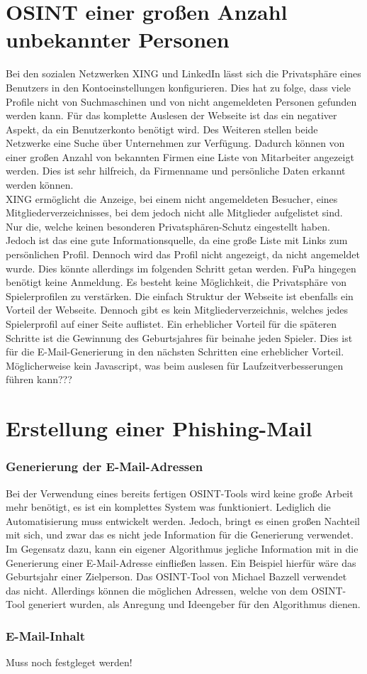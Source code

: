 \section{OSINT einer großen Anzahl unbekannter Personen}
Bei den sozialen Netzwerken XING und LinkedIn lässt sich die Privatsphäre eines Benutzers in den Kontoeinstellungen konfigurieren. Dies hat zu folge, dass viele Profile nicht von Suchmaschinen und von nicht angemeldeten Personen gefunden werden kann. Für das komplette Auslesen der Webseite ist das ein negativer Aspekt, da ein Benutzerkonto benötigt wird. Des Weiteren stellen beide Netzwerke eine Suche über Unternehmen zur Verfügung. Dadurch können von einer großen Anzahl von bekannten Firmen eine  Liste von Mitarbeiter angezeigt werden. Dies ist sehr hilfreich, da Firmenname und persönliche Daten erkannt werden können.\\
XING ermöglicht die Anzeige, bei einem nicht angemeldeten Besucher, eines Mitgliederverzeichnisses, bei dem jedoch nicht alle Mitglieder aufgelistet sind. Nur die, welche keinen besonderen Privatsphären-Schutz eingestellt haben. Jedoch ist das eine gute Informationsquelle, da eine große Liste mit Links zum persönlichen Profil. Dennoch wird das Profil nicht angezeigt, da nicht angemeldet wurde. Dies könnte allerdings im folgenden Schritt getan werden.
FuPa hingegen benötigt keine Anmeldung. Es besteht keine Möglichkeit, die Privatsphäre von Spielerprofilen zu verstärken. Die einfach Struktur der Webseite ist ebenfalls ein Vorteil der Webseite. Dennoch gibt es kein Mitgliederverzeichnis, welches jedes Spielerprofil auf einer Seite auflistet. Ein erheblicher Vorteil für die späteren Schritte ist die Gewinnung des Geburtsjahres für beinahe jeden Spieler. Dies ist für die E-Mail-Generierung in den nächsten Schritten eine erheblicher Vorteil. Möglicherweise kein Javascript, was beim auslesen für Laufzeitverbesserungen führen kann???

\section{Erstellung einer Phishing-Mail}
	\subsubsection{Generierung der E-Mail-Adressen}
	Bei der Verwendung eines bereits fertigen OSINT-Tools wird keine große Arbeit mehr benötigt, es ist ein komplettes System was funktioniert. Lediglich die Automatisierung muss entwickelt werden. Jedoch, bringt es einen großen Nachteil mit sich, und zwar das es nicht jede Information für die Generierung verwendet. Im Gegensatz dazu, kann ein eigener Algorithmus jegliche Information mit in die Generierung einer E-Mail-Adresse einfließen lassen. Ein Beispiel hierfür wäre das Geburtsjahr einer Zielperson. Das OSINT-Tool von Michael Bazzell verwendet das nicht. Allerdings können die möglichen Adressen, welche von dem OSINT-Tool generiert wurden, als Anregung und Ideengeber für den Algorithmus dienen.
	\subsubsection{E-Mail-Inhalt}
	Muss noch festgleget werden!

